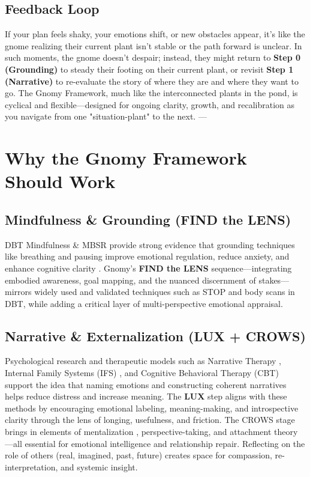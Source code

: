 \documentclass{article}
\begin{document}
\subsection{Feedback Loop}
If your plan feels shaky, your emotions shift, or new obstacles appear, it's like the gnome realizing their current plant isn't stable or the path forward is unclear. In such moments, the gnome doesn't despair; instead, they might return to \textbf{Step 0 (Grounding)} to steady their footing on their current plant, or revisit \textbf{Step 1 (Narrative)} to re-evaluate the story of where they are and where they want to go. The Gnomy Framework, much like the interconnected plants in the pond, is cyclical and flexible—designed for ongoing clarity, growth, and recalibration as you navigate from one "situation-plant" to the next.
---

\section{Why the Gnomy Framework Should Work}

\subsection{Mindfulness \& Grounding (FIND the LENS)}
DBT Mindfulness \& MBSR provide strong evidence that grounding techniques like breathing and pausing improve emotional regulation, reduce anxiety, and enhance cognitive clarity \cite{linehan1993cognitive, kabat1990full}. Gnomy’s \textbf{FIND the LENS} sequence—integrating embodied awareness, goal mapping, and the nuanced discernment of stakes—mirrors widely used and validated techniques such as STOP and body scans in DBT, while adding a critical layer of multi-perspective emotional appraisal.

\subsection{Narrative \& Externalization (LUX + CROWS)}
Psychological research and therapeutic models such as Narrative Therapy \cite{white1990narrative}, Internal Family Systems (IFS) \cite{schwartz1995internal}, and Cognitive Behavioral Therapy (CBT) \cite{beck1979cognitive} support the idea that naming emotions and constructing coherent narratives helps reduce distress and increase meaning. The \textbf{LUX} step aligns with these methods by encouraging emotional labeling, meaning-making, and introspective clarity through the lens of longing, usefulness, and friction. The CROWS stage brings in elements of mentalization \cite{fonagy2002affect}, perspective-taking, and attachment theory \cite{bowlby1969attachment}—all essential for emotional intelligence and relationship repair. Reflecting on the role of others (real, imagined, past, future) creates space for compassion, re-interpretation, and systemic insight.
\end{document}
